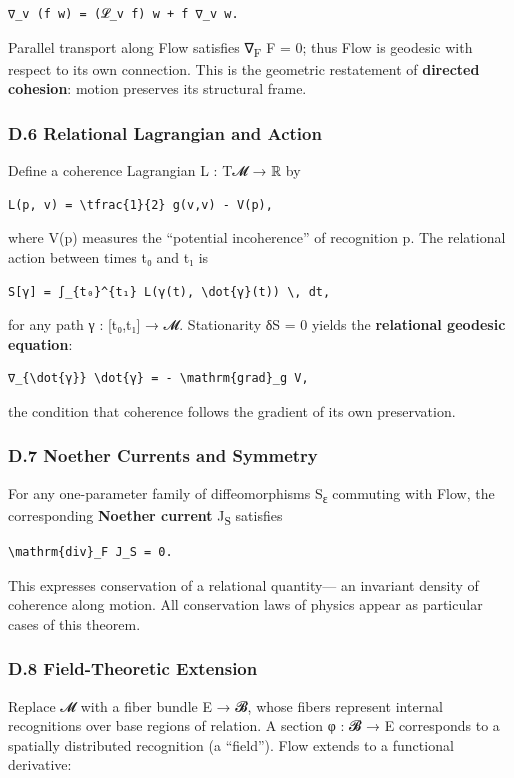 \documentclass[11pt]{article}
\begin{document}
\begin{verbatim}
∇_v (f w) = (𝓛_v f) w + f ∇_v w.
\end{verbatim}

Parallel transport along Flow satisfies ∇\textsubscript{F} F = 0;  
thus Flow is geodesic with respect to its own connection.  
This is the geometric restatement of \textbf{directed cohesion}:  
motion preserves its structural frame.
\subsubsection*{D.6 Relational Lagrangian and Action}
\label{sec:org2e49f49}
Define a coherence Lagrangian L : T𝓜 → ℝ by

\begin{verbatim}
L(p, v) = \tfrac{1}{2} g(v,v) - V(p),
\end{verbatim}

where V(p) measures the “potential incoherence” of recognition p.  
The relational action between times t₀ and t₁ is

\begin{verbatim}
S[γ] = ∫_{t₀}^{t₁} L(γ(t), \dot{γ}(t)) \, dt,
\end{verbatim}

for any path γ : [t₀,t₁] → 𝓜.  
Stationarity δS = 0 yields the \textbf{relational geodesic equation}:

\begin{verbatim}
∇_{\dot{γ}} \dot{γ} = - \mathrm{grad}_g V,
\end{verbatim}

the condition that coherence follows the gradient of its own preservation.
\subsubsection*{D.7 Noether Currents and Symmetry}
\label{sec:org22f9160}
For any one-parameter family of diffeomorphisms S\textsubscript{ε} commuting with Flow,  
the corresponding \textbf{Noether current} J\textsubscript{S} satisfies

\begin{verbatim}
\mathrm{div}_F J_S = 0.
\end{verbatim}

This expresses conservation of a relational quantity—  
an invariant density of coherence along motion.  
All conservation laws of physics appear as particular cases of this theorem.
\subsubsection*{D.8 Field-Theoretic Extension}
\label{sec:org1d42515}
Replace 𝓜 with a fiber bundle E → 𝓑,  
whose fibers represent internal recognitions over base regions of relation.  
A section φ : 𝓑 → E corresponds to a spatially distributed recognition (a “field”).  
Flow extends to a functional derivative:
\end{document}
